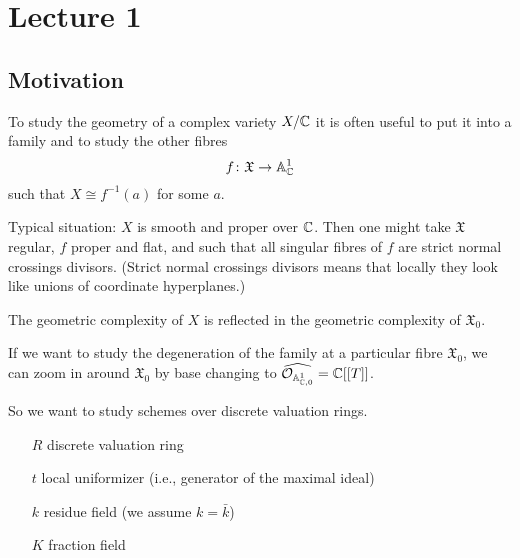 \section{Lecture 1}

\subsection{Motivation}

To study the geometry of a complex variety $X/\mathbb{C}$ it is often useful to put it
into a family and to study the other fibres
\[
	f \colon \mathfrak{X} \to \mathbb{A}^{1}_{\mathbb{C}}
\]
such that $X \cong f^{-1}(a)$ for some $a$.

Typical situation: $X$ is smooth and proper over $\mathbb{C}$. Then one might take
$\mathfrak{X}$ regular, $f$ proper and flat, and such that all singular fibres
of $f$ are strict normal crossings divisors.
(Strict normal crossings divisors means that locally they look like unions of
coordinate hyperplanes.)
\begin{idea}
	The geometric complexity of $X$ is reflected in the geometric
	complexity of $\mathfrak{X}_{0}$.

	If we want to study the degeneration of the family at a particular
	fibre $\mathfrak{X}_{0}$, we can zoom in around $\mathfrak{X}_{0}$ by
	base changing to $\widehat{\mathcal{O}_{\mathbb{A}^{1}_{\mathbb{C},0}}} = \mathbb{C}[[T]]$.

	So we want to study schemes over discrete valuation rings.
\end{idea}

\begin{notation}
	\begin{itemize}
		\item[$R$] discrete valuation ring
		\item[$t$] local uniformizer (i.e., generator of the maximal ideal)
		\item[$k$] residue field (we assume $k = \bar{k}$)
		\item[$K$] fraction field
	\end{itemize}
\end{notation}

